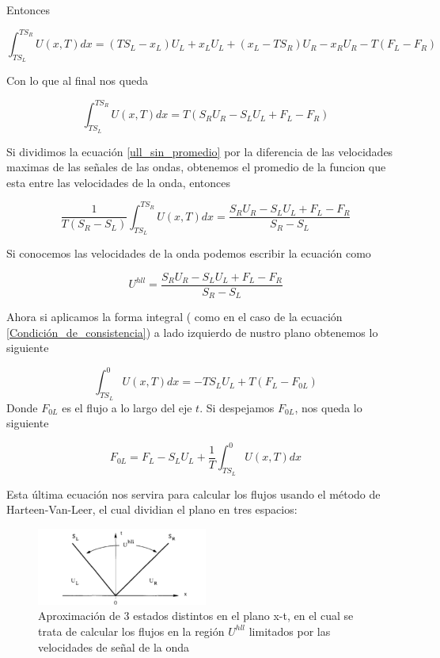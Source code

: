 \documentclass[12pt,a4paper]{book}
\begin{document}
Entonces 

\begin{equation*}
\int_{T S_L}^{T S_R} U \left(x, T \right)dx=
\left( T S_L - x_L \right) U_L+ x_L U_L +
\left( x_L - T S_R \right) U_R-x_R U_R -
T \left( F_L- F_R \right)
\end{equation*}

Con lo que al final nos queda

\begin{equation} \label{ull_sin_promedio}
\int_{T S_L}^{T S_R} U \left(x, T \right)dx=
T \left( S_R U_R - S_L U_L + F_L - F_R \right)
\end{equation}

Si dividimos la ecuación \ref{ull_sin_promedio} por la diferencia de las velocidades maximas de las señales de las ondas, obtenemos el promedio de la funcion que esta entre las velocidades de la onda, entonces

\begin{equation}
\frac{1}{T \left( S_R -S_L \right)}\int_{T S_L}^{T S_R} U \left(x, T \right)dx =
\frac{S_R U_R - S_L U_L + F_L - F_R}{S_R - S_L}
\end{equation}

Si conocemos las velocidades de la onda podemos escribir la ecuación como 

\begin{equation}\label{u_hll}
U^{hll} = \frac{S_R U_R - S_L U_L + F_L - F_R}{S_R - S_L}
\end{equation}

Ahora si aplicamos la forma integral ( como en el caso de la ecuación \ref{Condición_de_consistencia}) a lado izquierdo de nustro plano obtenemos lo siguiente

\begin{equation}
\int_{T S_L}^{0} U\left( x, T \right) dx = 
-T S_L U_L+T \left( F_L- F_{0L} \right)
\end{equation}
Donde $F_{0L}$ es el flujo a lo largo del eje $t$. Si despejamos $F_{0L}$, nos queda lo siguiente

\begin{equation}\label{ec F_0L}
F_{0L} = F_L - S_L U_L + \frac{1}{T}  \int_{T S_L}^{0} U\left( x, T \right) dx
\end{equation}

Esta última ecuación nos servira para calcular los flujos usando el método de Harteen-Van-Leer, el cual dividian el plano en tres espacios:

\begin{figure} %
  \centering
    \includegraphics[width=0.5\textwidth]{Figuras/HLL.png}
  \caption{Aproximación de 3 estados distintos en el plano x-t, en el cual se trata de calcular los flujos en la región $U^{hll}$ limitados por las velocidades de señal de la onda}
  \label{fig:HLL}
\end{figure}
\end{document}
